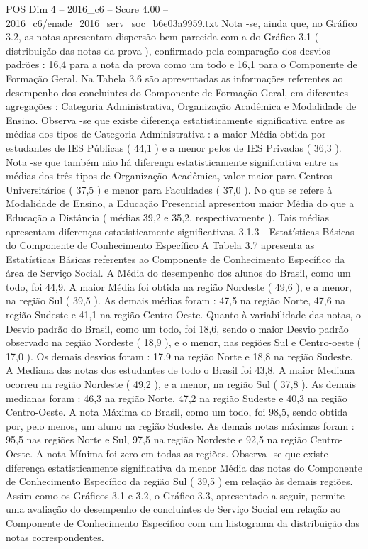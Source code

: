 \begin{textsample}{POS Dim 4 – 2016\_c6 – Score 4.00 – 2016\_c6/enade\_2016\_serv\_soc\_b6e03a9959.txt}
Nota -se, ainda que, no Gráfico 3.2, as notas apresentam dispersão bem parecida com a do Gráfico 3.1 ( distribuição das notas da prova ), confirmado pela comparação dos desvios padrões : 16,4 para a nota da prova como um todo e 16,1 para o Componente de Formação Geral.
Na Tabela 3.6 são apresentadas as informações referentes ao desempenho dos concluintes do Componente de Formação Geral, em diferentes agregações : Categoria Administrativa, Organização Acadêmica e Modalidade de Ensino.
Observa -se que existe diferença estatisticamente significativa entre as médias dos tipos de Categoria Administrativa : a maior Média obtida por estudantes de IES Públicas ( 44,1 ) e a menor pelos de IES Privadas ( 36,3 ).
Nota -se que também não há diferença estatisticamente significativa entre as médias dos três tipos de Organização Acadêmica, valor maior para Centros Universitários ( 37,5 ) e menor para Faculdades ( 37,0 ).
No que se refere à Modalidade de Ensino, a Educação Presencial apresentou maior Média do que a Educação a Distância ( médias 39,2 e 35,2, respectivamente ).
Tais médias apresentam diferenças estatisticamente significativas. 3.1.3 - Estatísticas Básicas do Componente de Conhecimento Específico A Tabela 3.7 apresenta as Estatísticas Básicas referentes ao Componente de Conhecimento Específico da área de Serviço Social.
A Média do desempenho dos alunos do Brasil, como um todo, foi 44,9.
A maior Média foi obtida na região Nordeste ( 49,6 ), e a menor, na região Sul ( 39,5 ).
As demais médias foram : 47,5 na região Norte, 47,6 na região Sudeste e 41,1 na região Centro-Oeste.
Quanto à variabilidade das notas, o Desvio padrão do Brasil, como um todo, foi 18,6, sendo o maior Desvio padrão observado na região Nordeste ( 18,9 ), e o menor, nas regiões Sul e Centro-oeste ( 17,0 ).
Os demais desvios foram : 17,9 na região Norte e 18,8 na região Sudeste.
A Mediana das notas dos estudantes de todo o Brasil foi 43,8.
A maior Mediana ocorreu na região Nordeste ( 49,2 ), e a menor, na região Sul ( 37,8 ).
As demais medianas foram : 46,3 na região Norte, 47,2 na região Sudeste e 40,3 na região Centro-Oeste.
A nota Máxima do Brasil, como um todo, foi 98,5, sendo obtida por, pelo menos, um aluno na região Sudeste.
As demais notas máximas foram : 95,5 nas regiões Norte e Sul, 97,5 na região Nordeste e 92,5 na região Centro-Oeste.
A nota Mínima foi zero em todas as regiões.
Observa -se que existe diferença estatisticamente significativa da menor Média das notas do Componente de Conhecimento Específico da região Sul ( 39,5 ) em relação às demais regiões.
Assim como os Gráficos 3.1 e 3.2, o Gráfico 3.3, apresentado a seguir, permite uma avaliação do desempenho de concluintes de Serviço Social em relação ao Componente de Conhecimento Específico com um histograma da distribuição das notas correspondentes.

\end{textsample}
